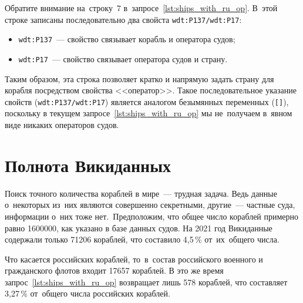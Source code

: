Обратите внимание на~строку~7 в~запросе~\ref{lst:ships_with_ru_op}. 
В~этой строке записаны последовательно два свойста \texttt{wdt:P137/wdt:P17}:
\begin{itemize}
	\item \texttt{wdt:P137}~--- свойство  связывает корабль и оператора судов;
	\item \texttt{wdt:P17}~--- свойство  связывает оператора судов и страну.
\end{itemize}
Таким образом, эта строка позволяет кратко и напрямую задать страну для корабля 
посредством свойства <<оператор>>. 
Такое последовательное указание свойств (\texttt{wdt:P137/wdt:P17}) 
является аналогом безымянных переменных (\lstinline|[]|),
поскольку в текущем запросе~\ref{lst:ships_with_ru_op} 
мы не~получаем в~явном виде никаких операторов судов. 




\newpage
\section{Полнота Викиданных}

Поиск точного количества кораблей в мире~--- трудная задача. 
Ведь данные о~некоторых из~них являются совершенно секретными, 
другие~--- частные суда, информации о~них тоже нет.\, 
Предположим, что общее число кораблей примерно равно \num{1600000}, 
как указано в базе данных судов. %
На 2021 год Викиданные содержали только \num{71206} кораблей, 
что составило 4,5\,\% от~их~общего числа.


Что касается российских кораблей, 
то~в~состав российского военного и гражданского флотов входит 
\num{17657} кораблей. %
В это же время запрос~\ref{lst:ships_with_ru_op} возвращает лишь 578 кораблей, 
что составляет 3,27\,\% от~общего числа российских кораблей. 

